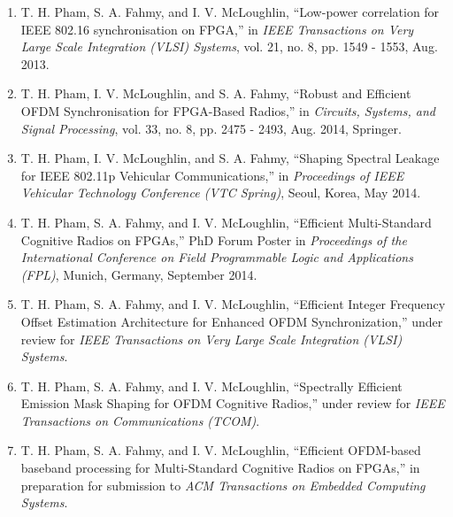 \begin{enumerate}

\item  T. H. Pham, S. A. Fahmy, and I. V. McLoughlin, ``Low-power correlation for IEEE 802.16 synchronisation on FPGA,'' in \textit{IEEE Transactions on Very Large Scale Integration (VLSI) Systems}, vol. 21, no. 8, pp. 1549 - 1553, Aug. 2013.

\item T. H. Pham, I. V. McLoughlin, and S. A. Fahmy, ``Robust and Efficient OFDM Synchronisation for FPGA-Based Radios,'' in \textit{Circuits, Systems, and Signal Processing}, vol. 33, no. 8, pp. 2475 - 2493, Aug. 2014, Springer.

\item  T. H. Pham, I. V. McLoughlin, and S. A. Fahmy, ``Shaping Spectral Leakage for IEEE 802.11p Vehicular Communications,'' in \textit{Proceedings of IEEE Vehicular Technology Conference (VTC Spring)}, Seoul, Korea, May 2014.

\item T. H. Pham, S. A. Fahmy, and I. V. McLoughlin, ``Efficient Multi-Standard Cognitive Radios on FPGAs,'' PhD Forum Poster in \textit{Proceedings of the International Conference on Field Programmable Logic and Applications (FPL)}, Munich, Germany, September 2014.

\item T. H. Pham, S. A. Fahmy, and I. V. McLoughlin, ``Efficient Integer Frequency Offset Estimation Architecture for Enhanced OFDM Synchronization,'' under review for \textit{IEEE Transactions on Very Large Scale Integration (VLSI) Systems}.

\item T. H. Pham, S. A. Fahmy, and I. V. McLoughlin, ``Spectrally Efficient Emission Mask Shaping for OFDM Cognitive Radios,'' under review for \textit{IEEE Transactions on Communications (TCOM)}.

\item T. H. Pham, S. A. Fahmy, and I. V. McLoughlin, ``Efficient OFDM-based baseband processing for Multi-Standard Cognitive Radios on FPGAs,'' in preparation for submission to \emph{ACM Transactions on Embedded Computing Systems}.

\end{enumerate}
